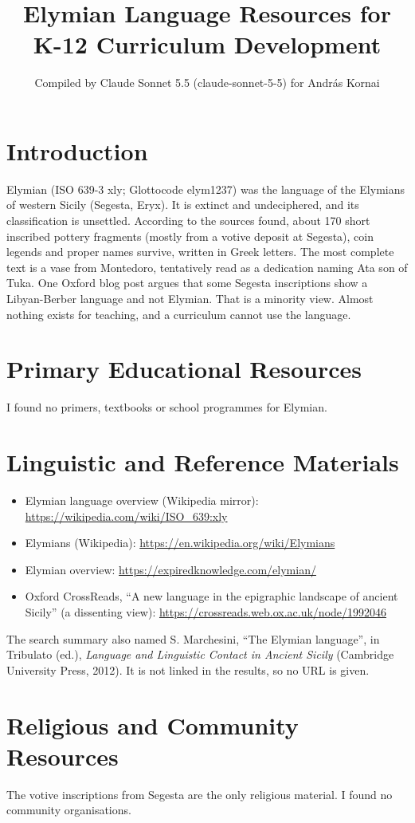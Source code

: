 \documentclass[12pt]{article}
\title{Elymian Language Resources for K-12 Curriculum Development}
\author{Compiled by Claude Sonnet 5.5 (claude-sonnet-5-5) for Andr\'as Kornai}
\date{}
\begin{document}
\maketitle

\section{Introduction}
Elymian (ISO 639-3 xly; Glottocode elym1237) was the language of the Elymians of western Sicily (Segesta, Eryx). It is extinct and undeciphered, and its classification is unsettled. According to the sources found, about 170 short inscribed pottery fragments (mostly from a votive deposit at Segesta), coin legends and proper names survive, written in Greek letters. The most complete text is a vase from Montedoro, tentatively read as a dedication naming Ata son of Tuka. One Oxford blog post argues that some Segesta inscriptions show a Libyan-Berber language and not Elymian. That is a minority view. Almost nothing exists for teaching, and a curriculum cannot use the language.

\section{Primary Educational Resources}
I found no primers, textbooks or school programmes for Elymian.

\section{Linguistic and Reference Materials}
\begin{itemize}
\item Elymian language overview (Wikipedia mirror): \url{https://wikipedia.com/wiki/ISO_639:xly}
\item Elymians (Wikipedia): \url{https://en.wikipedia.org/wiki/Elymians}
\item Elymian overview: \url{https://expiredknowledge.com/elymian/}
\item Oxford CrossReads, ``A new language in the epigraphic landscape of ancient Sicily'' (a dissenting view): \url{https://crossreads.web.ox.ac.uk/node/1992046}
\end{itemize}
The search summary also named S. Marchesini, ``The Elymian language'', in Tribulato (ed.), \emph{Language and Linguistic Contact in Ancient Sicily} (Cambridge University Press, 2012). It is not linked in the results, so no URL is given.

\section{Religious and Community Resources}
The votive inscriptions from Segesta are the only religious material. I found no community organisations.
\end{document}
